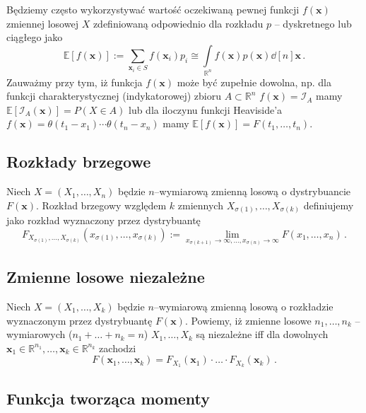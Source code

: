\documentclass{myclass}
\begin{document}
Będziemy często wykorzystywać wartość oczekiwaną pewnej funkcji \(f(\mathbf{x})\) zmiennej losowej
\(X\) zdefiniowaną odpowiednio dla rozkładu \(p\) -- dyskretnego lub ciągłego jako
\begin{equation*}
    \mathbb{E}[f(\mathbf{x})] := \sum_{\mathbf{x}_i \in S} f(\mathbf{x}_i)p_i \cong \int\limits_{\mathbb{R}^n}f(\mathbf{x})p(\mathbf{x})\dd[n]{\mathbf{x}}\,.
\end{equation*}
Zauważmy przy tym, iż funkcja \(f(\mathbf{x})\) może być zupełnie dowolna, np. dla funkcji
charakterystycznej (indykatorowej) zbioru \(A \subset \mathbb{R}^n\) \(f(\mathbf{x}) =
\mathcal{I}_A\) mamy \(\mathbb{E}[\mathcal{I}_A(\mathbf{x})] = P(X \in A)\) lub dla iloczynu funkcji
Heaviside'a \(f(\mathbf{x}) = \theta(t_1 - x_1)\cdots\theta(t_n - x_n)\) mamy
\(\mathbb{E}[f(\mathbf{x})] = F(t_1,\ldots, t_n)\).

\subsection{Rozkłady brzegowe}

Niech \(X = (X_1, \ldots, X_n)\) będzie \(n\)--wymiarową zmienną losową o dystrybuancie
\(F(\mathbf{x})\). Rozkład brzegowy względem \(k\) zmiennych \(X_{\sigma(1)},\ldots,X_{\sigma(k)}\)
definiujemy jako rozkład wyznaczony przez dystrybuantę
\begin{equation*}
    F_{X_{\sigma(1)},\ldots,X_{\sigma(k)}} (x_{\sigma(1)},\ldots,x_{\sigma(k)}) := \lim_{x_{\sigma(k+1)}\to\infty,\ldots,x_{\sigma(n)}\to\infty} F(x_1,\ldots,x_n)\,.
\end{equation*}

\subsection{Zmienne losowe niezależne}
Niech \(X = (X_1, \ldots, X_k)\) będzie \(n\)--wymiarową zmienną losową o rozkładzie wyznaczonym
przez dystrybuantę \(F(\mathbf{x})\). Powiemy, iż zmienne losowe \(n_1,\ldots,n_k\) -- wymiarowych
(\(n_1 + \ldots + n_k = n\)) \(X_1, \ldots, X_k\) są niezależne iff dla dowolnych
\(\mathbf{x}_1\in\mathbb{R}^{n_1},\ldots,\mathbf{x}_k\in\mathbb{R}^{n_k}\) zachodzi
\begin{equation*}
    F(\mathbf{x}_1,\ldots,\mathbf{x}_k) = F_{X_1}(\mathbf{x}_1)\cdot\ldots\cdot F_{X_k}(\mathbf{x}_k)\,.
\end{equation*}

\subsection{Funkcja tworząca momenty}
\end{document}
